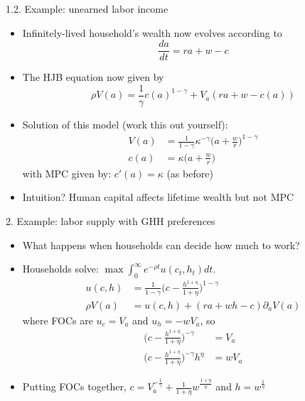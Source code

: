 \documentclass[10pt]{beamer}
\begin{document}
\begin{frame}{1.2. Example: unearned labor income}
\begin{itemize}
\item Infinitely-lived household's wealth now evolves according to 
\begin{equation*}
	\frac{da}{dt} = ra + w - c
\end{equation*}

\item The HJB equation now given by
\begin{equation*}
	\rho V(a) = \frac{1}{\gamma} c(a)^{1-\gamma} + V_a (r a + w - c(a))
\end{equation*}

\item Solution of this model (work this out yourself):
\begin{align*}
	V(a) &= \frac{1}{1-\gamma} \kappa^{-\gamma} \Big( a + \frac{w}{r} \Big)^{1-\gamma} \\
	c(a) &= \kappa \Big(a + \frac{w}{r} \Big)
\end{align*}
with MPC given by: $c'(a) = \kappa$ (as before)

\item Intuition? Human capital affects lifetime wealth but not MPC
\end{itemize}
\end{frame}




\begin{frame}{2. Example: labor supply with GHH preferences}
\begin{itemize}
\item What happens when households can decide how much to work? 

\item Households solve: $\max \int_0^\infty e^{- \rho t} u(c_t, h_t) dt$.  
\begin{align*}
	u(c, h) &= \frac{1}{1-\gamma} \bigg( c - \frac{ h^{1+\eta}}{1+\eta} \bigg)^{1-\gamma} \\
	\rho V(a) &= u(c, h) + (r a + w h - c) \partial_a V(a)
\end{align*}
where FOCs are $u_c = V_a$ and $u_h = - w V_a$, so 
\begin{align*}
	\bigg( c - \frac{h^{1+\eta}}{1+\eta} \bigg)^{-\gamma} &= V_a \\
	\bigg( c - \frac{h^{1+\eta}}{1+\eta} \bigg)^{-\gamma} h^\eta &= w V_a
\end{align*}

\item Putting FOCs together, $c = V_a^{- \frac{1}{\gamma}} + \frac{1}{1 + \eta} w^\frac{1+\eta}{\eta}$ and $h = w^\frac{1}{\eta}$
\end{itemize}
\end{frame}
\end{document}
